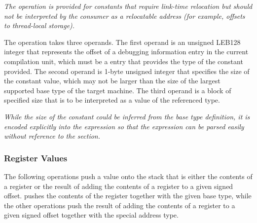 \begin{enumerate}[1. ]
\textit{The \DWOPconstxNAME{} operation is provided for constants that
require link-time relocation but should not be
interpreted by the consumer as a relocatable address
(for example, offsets to thread-local storage).}

\itembfnl{\DWOPconsttypeTARG}
The \DWOPconsttypeNAME{} operation takes three operands. The first operand 
is an unsigned LEB128 integer that represents the offset of a debugging
information entry in the current compilation unit, which must be a
\DWTAGbasetype{} entry that provides the type of the constant provided. The
second operand is 1-byte unsigned integer that specifies the size of the
constant value, which may not be larger than the size of the largest supported
base type of the target machine. The third operand is a block of specified 
size that is to be interpreted as a value of the referenced type.

\textit{While the size of the constant could be inferred from the base type
definition, it is encoded explicitly into the expression so that the
expression can be parsed easily without reference to the \dotdebuginfo{}
section.}

\end{enumerate}

\subsubsection{Register Values}
\label{chap:registervalues}
The following operations push a value onto the stack that is either the
contents of a register or the result of adding the contents of a register
to a given signed offset. 
\DWOPregvaltype{} pushes the contents
of the register together with the given base type, while the other operations
push the result of adding the contents of a register to a given
signed offset together with the special address type.

